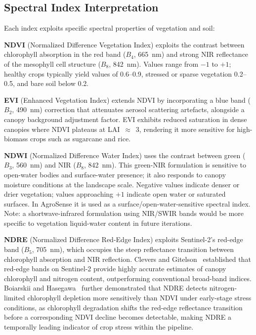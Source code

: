 \documentclass[conference]{IEEEtran}
\begin{document}
\subsection{Spectral Index Interpretation}

Each index exploits specific spectral properties of vegetation and soil:

\textbf{NDVI} (Normalized Difference Vegetation Index) exploits the contrast
between chlorophyll absorption in the red band ($B_4$, 665~nm) and strong NIR
reflectance of the mesophyll cell structure ($B_8$, 842~nm). Values range from
$-1$ to $+1$; healthy crops typically yield values of 0.6--0.9, stressed or
sparse vegetation 0.2--0.5, and bare soil below 0.2.

\textbf{EVI} (Enhanced Vegetation Index) extends NDVI by incorporating a blue
band ($B_2$, 490~nm) correction that attenuates aerosol scattering artefacts,
alongside a canopy background adjustment factor. EVI exhibits reduced saturation
in dense canopies where NDVI plateaus at LAI~$\approx$~3, rendering it more
sensitive for high-biomass crops such as sugarcane and rice.

\textbf{NDWI} (Normalized Difference Water Index) uses the contrast between
green ($B_3$, 560~nm) and NIR ($B_8$, 842~nm). This green-NIR formulation is
sensitive to open-water bodies and surface-water presence; it also responds to
canopy moisture conditions at the landscape scale. Negative values indicate
denser or drier vegetation; values approaching $+1$ indicate open water or
saturated surfaces. In AgroSense it is used as a surface/open-water-sensitive
spectral index. Note: a shortwave-infrared formulation using NIR/SWIR bands
would be more specific to vegetation liquid-water content in future iterations.

\textbf{NDRE} (Normalized Difference Red-Edge Index) exploits Sentinel-2's
red-edge band ($B_5$, 705~nm), which occupies the steep reflectance transition
between chlorophyll absorption and NIR reflection. Clevers and
Gitelson~\cite{clevers2013} established that red-edge bands on Sentinel-2
provide highly accurate estimates of canopy chlorophyll and nitrogen content,
outperforming conventional broad-band indices. Boiarskii and
Hasegawa~\cite{boiarskii2019} further demonstrated that NDRE detects
nitrogen-limited chlorophyll depletion more sensitively than NDVI under
early-stage stress conditions, as chlorophyll degradation shifts the red-edge
reflectance transition before a corresponding NDVI decline becomes detectable,
making NDRE a temporally leading indicator of crop stress within the pipeline.
\end{document}
